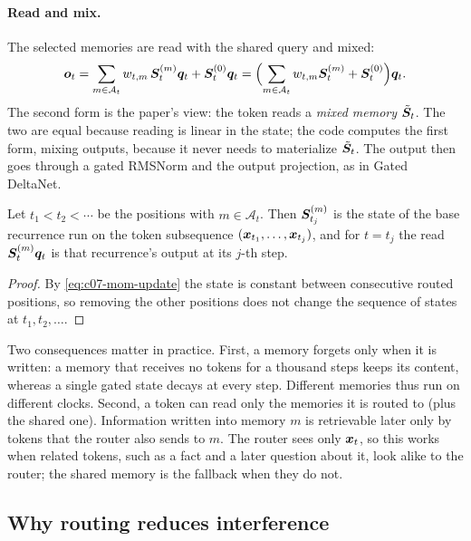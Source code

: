 \paragraph{Read and mix.} The selected memories are read with the shared query and mixed:
\begin{equation}\label{eq:c07-mom-read}
  \bm{o}_t = \sum_{m\in\mathcal{A}_t} w_{t,m}\,\bm{S}_t^{(m)}\bm{q}_t + \bm{S}_t^{(0)}\bm{q}_t
        = \Bigl(\sum_{m\in\mathcal{A}_t} w_{t,m}\bm{S}_t^{(m)} + \bm{S}_t^{(0)}\Bigr)\bm{q}_t .
\end{equation}
The second form is the paper's view: the token reads a \emph{mixed memory}
$\tilde{\bm{S}}_t$. The two are equal because reading is linear in the state; the code computes
the first form, mixing outputs, because it never needs to materialize $\tilde{\bm{S}}_t$. The output
then goes through a gated RMSNorm and the output projection, as in Gated DeltaNet.

\begin{proposition}\label{prop:c07-mom-sub}
Let $t_1<t_2<\cdots$ be the positions with $m\in\mathcal{A}_{t}$. Then
$\bm{S}^{(m)}_{t_j}$ is the state of the base recurrence run on the token subsequence
$(\bm{x}_{t_1},\dots,\bm{x}_{t_j})$, and for $t = t_j$ the read
$\bm{S}^{(m)}_{t}\bm{q}_t$ is that recurrence's output at its $j$-th step.
\end{proposition}
\begin{proof}
By \cref{eq:c07-mom-update} the state is constant between consecutive routed positions, so
removing the other positions does not change the sequence of states at $t_1, t_2, \dots$.
\end{proof}

Two consequences matter in practice. First, a memory forgets only when it is written: a
memory that receives no tokens for a thousand steps keeps its content, whereas a single
gated state decays at every step. Different memories thus run on different clocks. Second,
a token can read only the memories it is routed to (plus the shared one). Information
written into memory $m$ is retrievable later only by tokens that the router also sends to
$m$. The router sees only $\bm{x}_t$, so this works when related tokens, such as a fact and a
later question about it, look alike to the router; the shared memory is the fallback when they
do not.

\subsection{Why routing reduces interference}\label{sec:c07-mom-interference}

